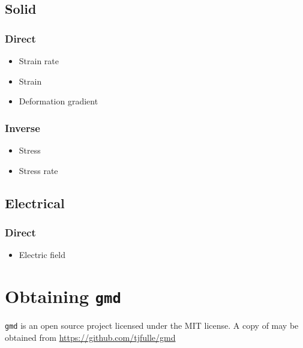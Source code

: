 \documentclass[11pt]{report}
\newcommand{\gmd}{\texttt{gmd}}
\begin{document}
\subsection{Solid}

\subsubsection{Direct}
\begin{itemize}
  \item Strain rate
  \item Strain
  \item Deformation gradient
\end{itemize}

\subsubsection{Inverse}
\begin{itemize}
  \item Stress
  \item Stress rate
\end{itemize}

\subsection{Electrical}

\subsubsection{Direct}

\begin{itemize}
  \item Electric field
\end{itemize}

\section{Obtaining \gmd{}}
\gmd{} is an open source project licensed under the MIT license. A copy of may
be obtained from \url{https://github.com/tjfulle/gmd}
\end{document}
